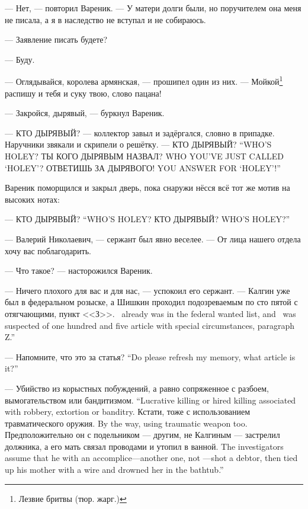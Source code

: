 --- Нет, --- повторил Вареник.
--- У матери долги были, но поручителем она меня не писала, а я в наследство не вступал и не собираюсь.

--- Заявление писать будете?

--- Буду.

\asterism

\textspace

--- Оглядывайся, королева армянская, --- прошипел один из них.
--- Мойкой\footnote{Лезвие бритвы (тюр. жарг.)} распишу и тебя и суку твою, слово пацана!

--- Закройся, дырявый, --- буркнул Вареник.

--- КТО ДЫРЯВЫЙ? --- коллектор завыл и задёргался, словно в припадке.
Наручники звякали и скрипели о решётку.
{--- КТО ДЫРЯВЫЙ?}
{``WHO'S HOLEY?}
{ТЫ КОГО ДЫРЯВЫМ НАЗВАЛ?}
{WHO YOU'VE JUST CALLED `HOLEY'?}
{ОТВЕТИШЬ ЗА ДЫРЯВОГО!}
{YOU ANSWER FOR `HOLEY'!''}

\textspace

Вареник поморщился и закрыл дверь, пока снаружи нёсся всё тот же мотив на высоких нотах:

{--- КТО ДЫРЯВЫЙ?}
{``WHO'S HOLEY?}
{КТО ДЫРЯВЫЙ?}
{WHO'S HOLEY?''}

\asterism

\textspace

--- Валерий Николаевич, --- сержант был явно веселее.
--- От лица нашего отдела хочу вас поблагодарить.

--- Что такое? --- насторожился Вареник.

--- Ничего плохого для вас и для нас, --- успокоил его сержант.
{--- Калгин уже был в федеральном розыске, а Шишкин проходил подозреваемым по сто пятой с отягчающими, пункт <<З>>.}
{\Kalgin\ already was in the federal wanted list, and \Shishkin\ was suspected of one hundred and five article with special circumstances, paragraph Z.''}

{--- Напомните, что это за статья?}
{``Do please refresh my memory, what article is it?''}

{--- Убийство из корыстных побуждений, а равно сопряженное с разбоем, вымогательством или бандитизмом.}
{``Lucrative killing or hired killing associated with robbery, extortion or banditry.}
{Кстати, тоже с использованием травматического оружия.}
{By the way, using traumatic weapon too.}
{Предположительно он с подельником --- другим, не Калгиным --- застрелил должника, а его мать связал проводами и утопил в ванной.}
{The investigators assume that he with an accomplice---another one, not \Kalgin---shot a debtor, then tied up his mother with a wire and drowned her in the bathtub.''}

